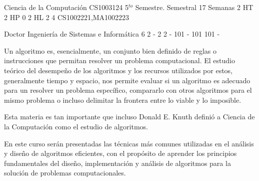 \documentclass[a4paper,8pt]{article}
\begin{document}
\setNombreProfesor{}
\setGradoProfesorAbreviado{}
\sylabusHeader

\academicaTable
{Ciencia de la Computación} %
{CS1003124} %
{5$^{to}$ Semestre.} %
{Semestral} %
{17 Semanas} %
{2 HT} %
{2 HP} %
{0} %
{2 HL}  %
{2} %
{4} %
{CS1002221,MA1002223} %

\administrativaTable
{Doctor} %
{Ingeniería de Sistemas e Informática} %
{6} %
{2} %
{-} %
{2} %
{2} %
{-} %
{101} %
{-} %
{101} %
{101} %
{-} %


\begin{fundamentacion}
Un algoritmo es, esencialmente, un conjunto bien definido de reglas o instrucciones
que permitan resolver un problema computacional. El estudio teórico del desempeño
de los algoritmos y los recursos utilizados por estos, generalmente tiempo y espacio, 
nos permite evaluar si un algoritmo es adecuado para un resolver un problema 
específico, compararlo con otros algoritmos para el mismo problema o incluso
delimitar la frontera entre lo viable y lo imposible.

Esta materia es tan importante que incluso Donald E. Knuth definió a
Ciencia de la Computación como el estudio de algoritmos.

En este curso serán presentadas las técnicas más comunes utilizadas en el análisis y diseño de 
algoritmos eficientes, con el propósito de aprender los principios fundamentales
del diseño, implementación y análisis de algoritmos para la solución de problemas
computacionales.

\end{fundamentacion}

\begin{sumilla}
\item \ALBasicAnalysis
\item \ALAlgorithmicStrategies
\item \ALFundamentalDataStructuresandAlgorithms
\item \ALBasicAutomataComputabilityandComplexity
\item \ALAdvancedDataStructuresAlgorithmsandAnalysis

\end{sumilla}
\end{document}

